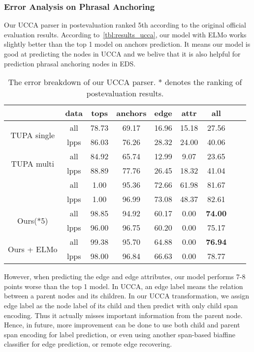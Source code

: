 \subsubsection{Error Analysis on Phrasal Anchoring}
\label{sssec:lex-phr:error-phr}
Our UCCA parser in postevaluation ranked 5th according to the
original official evaluation results. According
to~\autoref{tbl:results_ucca}, our model with ELMo works slightly
better than the top 1 model on anchors prediction. It means our model
is good at predicting the nodes in UCCA and we belive that it is also
helpful for prediction phrasal anchoring nodes in EDS.

\begin{table}[!tbp]
  \caption{\label{tbl:results_ucca} The error breakdown of our UCCA
    parser. * denotes the ranking of postevaluation results.}
\begin{center}
\setlength{\tabcolsep}{3pt}
\begin{tabular}{ccccccccc}
\toprule
                              & data & tops  & anchors & edge  & attr  & all   \\ \hline
\multirow{2}{*}{ TUPA
single }                      & all  & 78.73 & 69.17   & 16.96 & 15.18 & 27.56 \\
                              & lpps & 86.03 & 76.26   & 28.32 & 24.00 & 40.06 \\
\multirow{2}{*}{ TUPA
multi }                       & all  & 84.92 & 65.74   & 12.99 &  9.07 & 23.65 \\
                              & lpps & 88.89 & 77.76   & 26.45 & 18.32 & 41.04 \\
\multirow{2}{*}{\citet{Che:Dou:Xu:19}}       & all  & 1.00  & 95.36   & 72.66 & 61.98 & 81.67 \\
                              & lpps & 1.00  & 96.99   & 73.08 & 48.37 & 82.61 \\ \hline
\multirow{2}{*}{ Ours(*5)}    & all  & 98.85 & 94.92   & 60.17 & 0.00  & {\bf 74.00} \\
                              & lpps & 96.00 & 96.75   & 60.20 & 0.00  & 75.17 \\
\multirow{2}{*}{ Ours + ELMo} & all  & 99.38 & 95.70   & 64.88 & 0.00  & {\bf 76.94} \\
                              & lpps & 98.00 & 96.84   & 66.63 & 0.00  & 78.77 \\ \bottomrule
\end{tabular}
\end{center}
\end{table}

However, when predicting the edge and edge attributes, our model
performs 7-8 points worse than the top 1 model. In UCCA, an edge label
means the relation between a parent nodes and its children. In our
UCCA transformation, we assign edge label as the node label of its
child and then predict with only child span encoding. Thus it actually
misses important information from the parent node. Hence, in future,
more improvement can be done to use both child and parent span
encoding for label prediction, or even using another span-based
biaffine classifier for edge prediction, or remote edge recovering.

